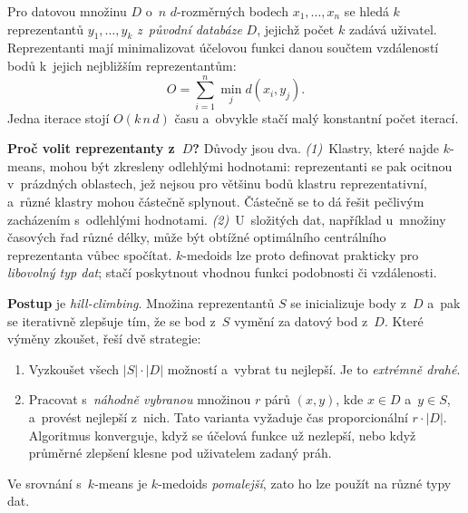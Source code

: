 \documentclass[11pt,a4paper]{article}
\theoremstyle{definition}
\begin{document}
\begin{defbox}
Pro datovou množinu $D$ o~$n$ $d$-rozměrných bodech $x_1,\dots,x_n$ se hledá $k$
reprezentantů $y_1,\dots,y_k$ \emph{z~původní databáze} $D$, jejichž počet $k$ zadává
uživatel. Reprezentanti mají minimalizovat účelovou funkci danou součtem vzdáleností bodů
k~jejich nejbližším reprezentantům:
\[ O=\sum_{i=1}^{n}\min_{j} d(x_i,y_j). \]
Jedna iterace stojí $O(k\,n\,d)$ času a~obvykle stačí malý konstantní počet iterací.

\textbf{Proč volit reprezentanty z~$D$?} Důvody jsou dva. \emph{(1)}~Klastry, které najde
$k$-means, mohou být zkresleny odlehlými hodnotami: reprezentanti se pak ocitnou v~prázdných
oblastech, jež nejsou pro většinu bodů klastru reprezentativní, a~různé klastry mohou
částečně splynout. Částečně se to dá řešit pečlivým zacházením s~odlehlými hodnotami.
\emph{(2)}~U~složitých dat, například u~množiny časových řad různé délky, může být obtížné
optimálního centrálního reprezentanta vůbec spočítat. $k$-medoids lze proto definovat
prakticky pro \emph{libovolný typ dat}; stačí poskytnout vhodnou funkci podobnosti či
vzdálenosti.

\textbf{Postup} je \emph{hill-climbing}. Množina reprezentantů $S$ se inicializuje body
z~$D$ a~pak se iterativně zlepšuje tím, že se bod z~$S$ vymění za datový bod z~$D$. Které
výměny zkoušet, řeší dvě strategie:
\begin{enumerate}
\item Vyzkoušet všech $|S|\cdot|D|$ možností a~vybrat tu nejlepší. Je to \emph{extrémně
      drahé}.
\item Pracovat s~\emph{náhodně vybranou} množinou $r$ párů $(x,y)$, kde $x\in D$ a~$y\in S$,
      a~provést nejlepší z~nich. Tato varianta vyžaduje čas proporcionální $r\cdot|D|$.
      Algoritmus konverguje, když se účelová funkce už nezlepší, nebo když průměrné zlepšení
      klesne pod uživatelem zadaný práh.
\end{enumerate}
Ve srovnání s~$k$-means je $k$-medoids \emph{pomalejší}, zato ho lze použít na různé typy dat.
\end{defbox}
\end{document}
